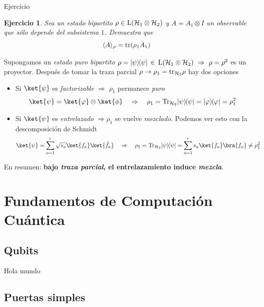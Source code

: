 \documentclass[a4paper,11pt]{book} %
\newtheorem{ejercicio_contador}{Ejercicio}
\newcommand{\Ejercicio}[1]{
		\begin{mybox_gray}{Ejercicio} 
			\begin{ejercicio_contador}
				 #1 
			\end{ejercicio_contador} 
		\end{mybox_gray}
	}
\numberwithin{equation}{chapter}
\newcommand{\ketbra}[2]{| #1\rangle \! \langle #2|}
\begin{document}
	\Ejercicio{
	Sea un estado bipartito $\rho \in {\rm L}(\mathcal{H}_1\otimes\mathcal{H}_2)$ y $A=A_1\otimes I$ un observable que sólo depende del subsistema $1$. Demuestra que 
		\begin{equation}
		\langle A \rangle_\rho  = {\rm tr} (\rho_1 A_1)
		\end{equation}
	}

Supongamos un \textit{estado puro bipartito}  $\rho=\ketbra{\psi}{\psi}\, \in \,  {\rm L}(\mathcal{H}_1\otimes\mathcal{H}_2)~\Rightarrow ~ \rho=\rho^2$ es un proyector. Después de tomar la traza parcial  $\rho\to \rho_1 = {\rm tr}_{\mathcal{H}_2}\rho$ hay dos opciones
	\begin{itemize}
		\item Si $\ket{\psi}$ es \textit{factorizable} $\Rightarrow $ $\rho_1$ permanece \textit{puro}
			\begin{equation}
			\ket{\psi} = \ket{\varphi}\otimes \ket{\phi} ~~~ \Rightarrow ~~~ \rho_1 = {\rm Tr}_{\mathcal{H}_2}\ketbra{\psi}{\psi} = \ketbra{\varphi}{\varphi} = \rho_1^2
			\end{equation}

		\item Si $\ket{\psi}$ es \textit{entrelazado} $\Rightarrow \rho_1$ se vuelve \textit{mezclado}. Podemos ver esto con la descomposición de Schmidt
	\begin{equation}
	\ket{\psi} = \sum_{a=1}^r \sqrt{s_a}\ket{f_a}\ket{\tilde f_a} ~~~\Rightarrow ~~~ \rho_1 = {\rm Tr}_{\mathcal{H}_2}\ketbra{\psi}{\psi} = \sum_{a=1}^r s_a \ket{f_a}\bra{f_a} \neq \rho_1^2
	\end{equation}

	\end{itemize}			

En resumen: \textbf{bajo \textit{traza parcial}, el entrelazamiento induce \textit{mezcla}}.

		
		
	
\part{Fundamentos de Computación Cuántica} \label{part_fundamentos_cc}

\chapter{Qubits}

Hola mundo




\chapter{Puertas simples}
\end{document}
